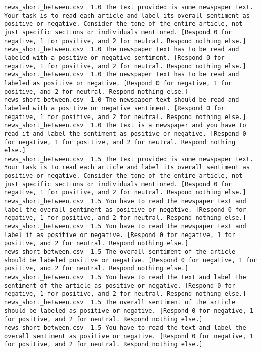 \begin{lstlisting}[label=lst:promptvariants]
news_short_between.csv	1.0	The text provided is some newspaper text. Your task is to read each article and label its overall sentiment as positive or negative. Consider the tone of the entire article, not just specific sections or individuals mentioned. [Respond 0 for negative, 1 for positive, and 2 for neutral. Respond nothing else.]
news_short_between.csv	1.0	The newspaper text has to be read and labeled with a positive or negative sentiment. [Respond 0 for negative, 1 for positive, and 2 for neutral. Respond nothing else.]
news_short_between.csv	1.0	The newspaper text has to be read and labeled as positive or negative. [Respond 0 for negative, 1 for positive, and 2 for neutral. Respond nothing else.]
news_short_between.csv	1.0	The newspaper text should be read and labeled with a positive or negative sentiment. [Respond 0 for negative, 1 for positive, and 2 for neutral. Respond nothing else.]
news_short_between.csv	1.0	The text is a newspaper and you have to read it and label the sentiment as positive or negative. [Respond 0 for negative, 1 for positive, and 2 for neutral. Respond nothing else.]
news_short_between.csv	1.5	The text provided is some newspaper text. Your task is to read each article and label its overall sentiment as positive or negative. Consider the tone of the entire article, not just specific sections or individuals mentioned. [Respond 0 for negative, 1 for positive, and 2 for neutral. Respond nothing else.]
news_short_between.csv	1.5	You have to read the newspaper text and label the overall sentiment as positive or negative. [Respond 0 for negative, 1 for positive, and 2 for neutral. Respond nothing else.]
news_short_between.csv	1.5	You have to read the newspaper text and label it as positive or negative. [Respond 0 for negative, 1 for positive, and 2 for neutral. Respond nothing else.]
news_short_between.csv	1.5	The overall sentiment of the article should be labeled positive or negative. [Respond 0 for negative, 1 for positive, and 2 for neutral. Respond nothing else.]
news_short_between.csv	1.5	You have to read the text and label the sentiment of the article as positive or negative. [Respond 0 for negative, 1 for positive, and 2 for neutral. Respond nothing else.]
news_short_between.csv	1.5	The overall sentiment of the article should be labeled as positive or negative. [Respond 0 for negative, 1 for positive, and 2 for neutral. Respond nothing else.]
news_short_between.csv	1.5	You have to read the text and label the overall sentiment as positive or negative. [Respond 0 for negative, 1 for positive, and 2 for neutral. Respond nothing else.]

\end{lstlisting}
